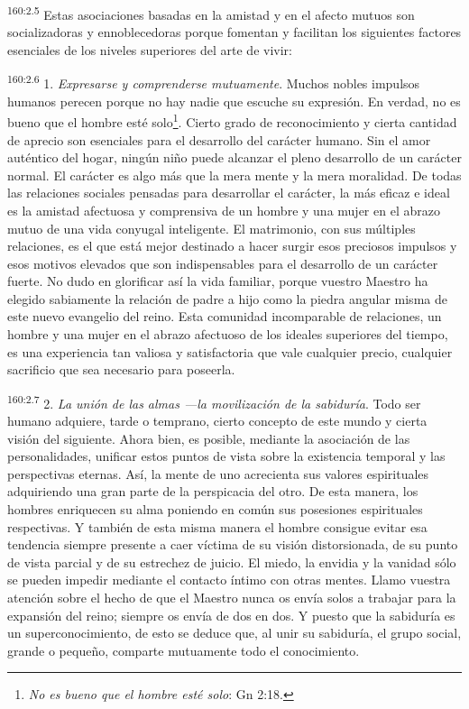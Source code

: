 \par 
\textsuperscript{160:2.5} Estas asociaciones basadas en la amistad y en el afecto mutuos son socializadoras y ennoblecedoras porque fomentan y facilitan los siguientes factores esenciales de los niveles superiores del arte de vivir:

\par 
\textsuperscript{160:2.6} 1. \textit{Expresarse y comprenderse mutuamente}. Muchos nobles impulsos humanos perecen porque no hay nadie que escuche su expresión. En verdad, no es bueno que el hombre esté solo\footnote{\textit{No es bueno que el hombre esté solo}: Gn 2:18.}. Cierto grado de reconocimiento y cierta cantidad de aprecio son esenciales para el desarrollo del carácter humano. Sin el amor auténtico del hogar, ningún niño puede alcanzar el pleno desarrollo de un carácter normal. El carácter es algo más que la mera mente y la mera moralidad. De todas las relaciones sociales pensadas para desarrollar el carácter, la más eficaz e ideal es la amistad afectuosa y comprensiva de un hombre y una mujer en el abrazo mutuo de una vida conyugal inteligente. El matrimonio, con sus múltiples relaciones, es el que está mejor destinado a hacer surgir esos preciosos impulsos y esos motivos elevados que son indispensables para el desarrollo de un carácter fuerte. No dudo en glorificar así la vida familiar, porque vuestro Maestro ha elegido sabiamente la relación de padre a hijo como la piedra angular misma de este nuevo evangelio del reino. Esta comunidad incomparable de relaciones, un hombre y una mujer en el abrazo afectuoso de los ideales superiores del tiempo, es una experiencia tan valiosa y satisfactoria que vale cualquier precio, cualquier sacrificio que sea necesario para poseerla.

\par 
\textsuperscript{160:2.7} 2. \textit{La unión de las almas ---la movilización de la sabiduría}. Todo ser humano adquiere, tarde o temprano, cierto concepto de este mundo y cierta visión del siguiente. Ahora bien, es posible, mediante la asociación de las personalidades, unificar estos puntos de vista sobre la existencia temporal y las perspectivas eternas. Así, la mente de uno acrecienta sus valores espirituales adquiriendo una gran parte de la perspicacia del otro. De esta manera, los hombres enriquecen su alma poniendo en común sus posesiones espirituales respectivas. Y también de esta misma manera el hombre consigue evitar esa tendencia siempre presente a caer víctima de su visión distorsionada, de su punto de vista parcial y de su estrechez de juicio. El miedo, la envidia y la vanidad sólo se pueden impedir mediante el contacto íntimo con otras mentes. Llamo vuestra atención sobre el hecho de que el Maestro nunca os envía solos a trabajar para la expansión del reino; siempre os envía de dos en dos. Y puesto que la sabiduría es un superconocimiento, de esto se deduce que, al unir su sabiduría, el grupo social, grande o pequeño, comparte mutuamente todo el conocimiento.

